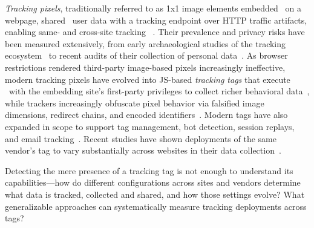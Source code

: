 \textit{Tracking pixels}, traditionally referred to as 1x1 image elements embedded \symInclusion\ on a webpage, shared \symSharing\ user data with a tracking endpoint over HTTP traffic artifacts, enabling same- and cross-site tracking
~\cite{Narayanan2017WebtapSpringer,englehardtOnlineTracking1millionsite2016}.
%
Their prevalence and privacy risks have been measured extensively, from early archaeological studies of the tracking ecosystem~\cite{lernerInternetJonesRaiders2016,englehardtOnlineTracking1millionsite2016} to recent audits of their collection of personal data~\cite{huCharacterizingPixelTracking2019,bekosPIIxelLeaksPassive2025}.
%
As browser restrictions rendered third-party image-based pixels increasingly ineffective, modern tracking pixels have evolved into JS-based \textit{tracking tags} that execute \symExecution\ with the embedding site's first-party privileges to collect richer behavioral data~\cite{bekosHitchhikersGuideFacebook2023,munirCookieGraphUnderstandingDetecting2023}, while trackers increasingly obfuscate pixel behavior via falsified image dimensions, redirect chains, and encoded identifiers~\cite{huCharacterizingPixelTracking2019}.
%
Modern tags have also expanded in scope to support tag management, bot detection, session replays, and email tracking~\cite{senolLeakyFormsStudy2022,acarNoBoundariesData2020,englehardtNoBoundariesCredentials2018,englehardtNeverSignedThis2018,fouadMissedFilterLists2020}. Recent studies have shown deployments of the same vendor's tag to vary substantially across websites in their data collection~\cite{kiesermanTrackerInstallationsAre2025,bekosPIIxelLeaksPassive2025,ghaniPixelConfigLongitudinalMeasurement2026}. 


\begin{opbox}
Detecting the mere presence of a tracking tag is not enough to understand its capabilities---how do different configurations across sites and vendors determine what data is tracked, collected and shared, and how those settings evolve? 
What generalizable approaches can systematically measure tracking deployments across tags?
\end{opbox}



